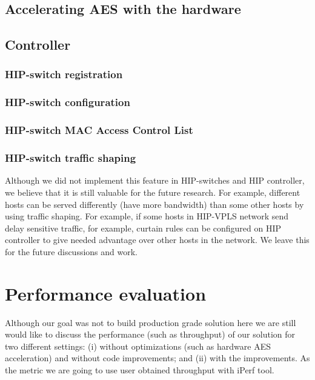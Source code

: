 \section{Accelerating AES with the hardware}

\section{Controller}
\subsection{HIP-switch registration}
\subsection{HIP-switch configuration}
\subsection{HIP-switch MAC Access Control List}
\subsection{HIP-switch traffic shaping}
Although we did not implement this feature in HIP-switches and HIP 
controller, we believe that it is still valuable for the future research.
For example, different hosts can be served differently (have more bandwidth)
than some other hosts by using traffic shaping. For example, if some hosts in HIP-VPLS 
network send delay sensitive traffic, for example, curtain rules can be configured 
on HIP controller to give needed advantage over other hosts in the network. We leave 
this for the future discussions and work.

\chapter{Performance evaluation}
Although our goal was not to build production grade solution
here we are still would like to discuss the performance 
(such as throughput) of our solution for two different settings:
(i) without optimizations (such as hardware AES acceleration) and 
without code improvements; and (ii) with the improvements. As the 
metric we are going to use user obtained throughput with iPerf tool. 

